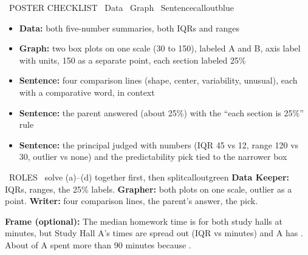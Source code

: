 \newpage
\begin{callout}{\IconTarget\ POSTER CHECKLIST \textperiodcentered\ Data \textperiodcentered\ Graph \textperiodcentered\ Sentence}{calloutblue}
\begin{itemize}[leftmargin=1.6em,itemsep=1pt,topsep=1pt]
  \item[$\square$] \textbf{Data:} both five-number summaries, both IQRs and ranges
  \item[$\square$] \textbf{Graph:} two box plots on one scale (30 to 150), labeled A and B, axis label with units, 150 as a separate point, each section labeled 25\%
  \item[$\square$] \textbf{Sentence:} four comparison lines (shape, center, variability, unusual), each with a comparative word, in context
  \item[$\square$] \textbf{Sentence:} the parent answered (about 25\%) with the ``each section is 25\%'' rule
  \item[$\square$] \textbf{Sentence:} the principal judged with numbers (IQR 45 vs 12, range 120 vs 30, outlier vs none) and the predictability pick tied to the narrower box
\end{itemize}
\posterrule
\end{callout}

\begin{callout}{\IconPuzzle\ ROLES \textperiodcentered\ solve (a)--(d) together first, then split}{calloutgreen}
\textbf{Data Keeper:} IQRs, ranges, the 25\% labels.\quad
\textbf{Grapher:} both plots on one scale, outlier as a point.\quad
\textbf{Writer:} four comparison lines, the parent's answer, the pick.
\end{callout}


\begin{sentenceframebox}[top=3pt,bottom=3pt]\raggedright\textbf{Frame (optional):} The median homework time is  for both study halls at  minutes, but Study Hall A's times are  spread out (IQR  vs  minutes) and A has . About  of A spent more than 90 minutes because .\end{sentenceframebox}

